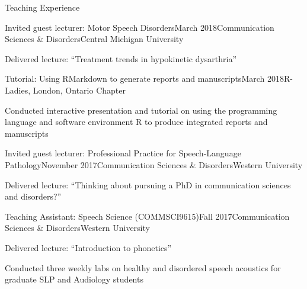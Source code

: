\documentclass{resume} %
\begin{document}



\begin{rSection}{Teaching Experience}
	
	\begin{rSubsection}{Invited guest lecturer: Motor Speech Disorders}{March 2018}{Communication Sciences \& Disorders}{Central Michigan University}
	\item Delivered lecture: ``Treatment trends in hypokinetic dysarthria''
	\end{rSubsection}
	
	\begin{rSubsection}{Tutorial: Using RMarkdown to generate reports and manuscripts}{March 2018}{R-Ladies, London, Ontario Chapter}
	\item Conducted interactive presentation and tutorial on using the programming language and software environment R to produce integrated reports and manuscripts
	\end{rSubsection}
	
	\begin{rSubsection}{Invited guest lecturer: Professional Practice for Speech-Language Pathology}{November 2017}{Communication Sciences \& Disorders}{Western University}
	\item Delivered lecture: ``Thinking about pursuing a PhD in communication sciences and disorders?''
	\end{rSubsection}
	
	\begin{rSubsection}{Teaching Assistant: Speech Science (COMMSCI9615)}{Fall 2017}{Communication Sciences \& Disorders}{Western University}
	\item Delivered lecture: ``Introduction to phonetics''
	\item Conducted three weekly labs on healthy and disordered speech acoustics for graduate SLP and Audiology students
	\end{rSubsection}
	

\end{rSection}
\end{document}
